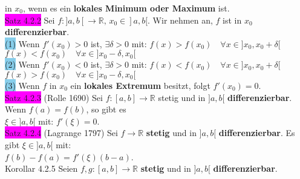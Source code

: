\documentclass[10pt]{article}
\begin{document}
                in \textcolor{NavyBlue}{$x_0$}, wenn es ein 
                \textbf{lokales Minimum oder Maximum} ist. \\
\colorbox{magenta}{Satz 4.2.2} Sei 
                \textcolor{NavyBlue}{$f:]a,b[\longrightarrow\mathbb{R},\,x_0\in]a,b[$}. 
                Wir nehmen an, \textcolor{NavyBlue}{$f$} ist in 
                \textcolor{NavyBlue}{$x_0$} \textbf{differenzierbar}.\\
        \indent \colorbox{SkyBlue}{(1)} Wenn \textcolor{NavyBlue}{$f'(x_0)>0$} ist, 
                \textcolor{NavyBlue}{$\exists\delta>0$} mit: 
                \textcolor{NavyBlue}{$f(x)>f(x_0)\quad\forall x\in]x_0,x_0+\delta[\qquad$}
                \textcolor{NavyBlue}{$f(x)<f(x_0)\quad\forall x\in]x_0-\delta,x_0[$} \\
        \indent \colorbox{SkyBlue}{(2)} Wenn \textcolor{NavyBlue}{$f'(x_0)<0$} ist, 
                \textcolor{NavyBlue}{$\exists\delta>0$} mit: 
                \textcolor{NavyBlue}{$f(x)<f(x_0)\quad\forall x\in]x_0,x_0+\delta[\qquad$}
                \textcolor{NavyBlue}{$f(x)>f(x_0)\quad\forall x\in]x_0-\delta,x_0[$} \\
        \indent \colorbox{SkyBlue}{(3)} Wenn \textcolor{NavyBlue}{$f$} in 
                \textcolor{NavyBlue}{$x_0$} ein \textbf{lokales Extremum} 
                besitzt, folgt \textcolor{NavyBlue}{$f'(x_0)=0$}.\\
\colorbox{magenta}{Satz 4.2.3} (Rolle 1690) Sei 
                \textcolor{NavyBlue}{$f:[a,b]\longrightarrow\mathbb{R}$}
                stetig und in \textcolor{NavyBlue}{$]a,b[$} \textbf{differenzierbar}. 
                Wenn \textcolor{NavyBlue}{$f(a)=f(b)$}, so gibt es \\
        \indent \textcolor{NavyBlue}{$\xi\in]a,b[$} mit: 
                \textcolor{NavyBlue}{$f'(\xi)=0$}.\\
\colorbox{magenta}{Satz 4.2.4} (Lagrange 1797) Sei 
                \textcolor{NavyBlue}{$f\longrightarrow\mathbb{R}$}
                \textbf{stetig} und in \textcolor{NavyBlue}{$]a,b[$} 
                \textbf{differenzierbar}. 
                Es gibt \textcolor{NavyBlue}{$\xi\in]a,b[$} mit: \\
        \indent \textcolor{NavyBlue}{$f(b)-f(a)=f'(\xi)(b-a)$}.\\
\colorbox{BurntOrange}{Korollar 4.2.5} Seien 
                \textcolor{NavyBlue}{$f,g:[a,b]\longrightarrow\mathbb{R}$}
                \textbf{stetig} und in \textcolor{NavyBlue}{$]a,b[$} 
                \textbf{differenzierbar}.\\
\end{document}
